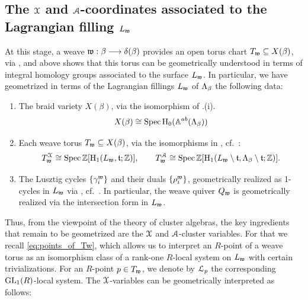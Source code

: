 \subsection{The $\mathcal{X}$ and $\mathcal{A}$-coordinates associated to the Lagrangian filling $L_{\mathfrak{w}}$}\label{ssec:X_coordinates_Lagrangian_filling_from_weave} At this stage, a weave $\mathfrak{w}:\beta\longrightarrow\delta(\beta)$ provides an open torus chart $T_{\mathfrak{w}}\subseteq X(\beta)$, via , and  above shows that this torus can be geometrically understood in terms of integral homology groups associated to the surface $L_{\mathfrak{w}}$. In particular, we have geometrized in terms of the Lagrangian fillings $L_{\mathfrak{w}}$ of $\Lambda_\beta$ the following data:
\begin{enumerate}
    \item The braid variety $X(\beta)$, via the isomorphism of .(i).
    $$X(\beta)\cong \operatorname{Spec} \mbox{H}_0(\mathbb{A}^{ab}(\Lambda_{\beta}))$$

    \item Each weave torus $T_{\mathfrak{w}}\subseteq X(\beta)$, via the isomorphisms in , cf.~:
    $$T_{\mathfrak{w}}^{\mathcal{X}}\cong \operatorname{Spec}\mathbb{Z}[\operatorname{H}_1(L_{\mathfrak{w}},\mathfrak{t};\mathbb{Z})],\qquad T_{\mathfrak{w}}^{\mathcal{A}}\cong \operatorname{Spec}\mathbb{Z}[\operatorname{H}_1(L_{\mathfrak{w}}\setminus \mathfrak{t},\Lambda_\beta\setminus \mathfrak{t};\mathbb{Z})].$$
    \item The Lusztig cycles $\{\gamma_i^{\mathfrak{w}}\}$ and their duals $\{\rho_i^{\mathfrak{w}}\}$, geometrically realized as 1-cycles in $L_{\mathfrak{w}}$ via , cf.~. In particular, the weave quiver $Q_{\mathfrak{w}}$ is geometrically realized via the intersection form in $L_{\mathfrak{w}}$.\\
\end{enumerate}

\noindent Thus, from the viewpoint of the theory of cluster algebras, the key ingredients that remain to be geometrized are the $\mathcal{X}$ and $\mathcal{A}$-cluster variables. For that we recall \eqref{eq:points_of_Tw}, which allows us to interpret an $R$-point of a weave torus as an isomorphism class of a rank-one $R$-local system on $L_{\mathfrak{w}}$ with certain trivializations. For an $R$-point $p\in T_{\mathfrak{w}}$, we denote by $\mathcal{L}_p$ the corresponding $\operatorname{GL}_1(R)$-local system. The $\mathcal{X}$-variables can be geometrically interpreted as follows:

